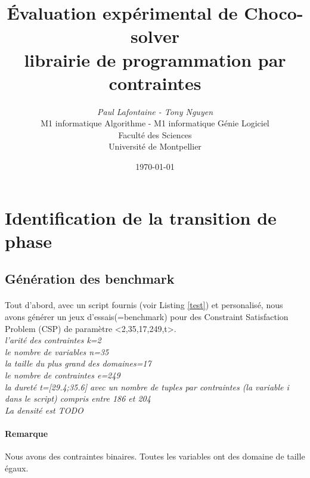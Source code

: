 \documentclass[a4paper]{article}
\begin{document}
	\title{Évaluation expérimental de Choco-solver\\librairie de programmation par contraintes}
	\author{\emph{Paul Lafontaine - Tony Nguyen}\\
  M1 informatique Algorithme - M1 informatique Génie Logiciel\\
	Faculté des Sciences\\
	Université de Montpellier}
	\date{\today}
	\maketitle
	\thispagestyle{empty}
	\newpage
	\thispagestyle{empty}
	\tableofcontents
	\newpage
	\newpage
  \section{Identification de la transition de phase} 
  \subsection{Génération des benchmark}
  \paragraph{}
    Tout d'abord, avec un script fournis (voir Listing \ref{test}) et personalisé, nous avons générer un jeux d'essais(=benchmark) pour des Constraint Satisfaction Problem (CSP) de paramètre <2,35,17,249,t>.\\
    \emph{l'arité des contraintes k=2\\
    le nombre de variables n=35\\
    la taille du plus grand des domaines=17\\
    le nombre de contraintes e=249\\
    la dureté t=[29.4;35.6] avec un nombre de tuples par contraintes (la variable i dans le script) compris entre 186 et 204\\
    La densité est TODO}
  
  \paragraph{Remarque}
    Nous avons des contraintes binaires. Toutes les variables ont des domaine de taille égaux.
\end{document}
